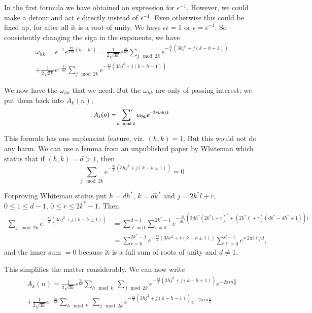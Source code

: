 In the first formula we have obtained an expression for
$\epsilon^{-1}$. However, we could make a detour and act $\epsilon $ directly
instead of $\epsilon^{-1}$. Even otherwise this could be fixed up, for
after all it is a root of unity. We have $\epsilon  \bar{\epsilon} =1$ or $\epsilon  =
\bar{\epsilon}^{-1}$. So consistently changing the sign in the exponents, we
have 
\begin{multline*}
  \omega_{hk}= \bar{\epsilon}^{-1} e^{\frac{\pi i}{12 k} (h- h')} =
  \frac{1}{2\sqrt{3k}} e^{\frac{\pi i}{6k}} \sum_{j \mod 2k}
  e^{-\frac{\pi i}{k}(3 h j^2 + j (k-h+1)) }\\
  + \frac{1}{2\sqrt{3k}} e^{-\frac{\pi i}{6k}} \sum_{j \mod 2k} e^{-
    \frac{\pi i}{k} (3h j^2 + j (k-h-1))}
\end{multline*}

We now have the $\omega_{hk}$ that we need. But the $\omega_{hk}$ are
only of passing interest; we put them back into $A_k (n)$;
$$
A_k(n) = \sideset{}{'}\sum_{h \mod k} \omega_{hk} e^{-2 \pi i n h/k}
$$

This formula has one unpleasant feature, viz. $(h, k)=1$. But this
would not do any harm. We can use a lemma from an unpublished paper by
Whiteman which status that if $(h, k)=d> 1$, then 
$$
\sum_{j \mod 2k} e^{- \frac{\pi i}{k} (3 h j^2 + j (k-h \pm 1))}=0
$$ 

For\pageoriginale proving Whiteman status put $h=dh^*$, $k= dk^*$ and
$j= 2k^* l+r$, $0 \leq 1 \leq d-1$, $0\leq r \leq 2k^* -1$. Then 
\begin{align*}
  \sum_{j \mod 2k} e^{- \frac{\pi i}{k} (3 h j^2 + j (k-h \pm 1))} & =
  \sum_{\ell =0}^{d-1} \sum^{2k^*-1}_{r=0} e^{- \frac{\pi i}{dk^*} (3
    dh^* (2k^*1+ r)^2 + (2k^* \ell + r)(dk^*- dh^* \pm 1) ))}\\
  & = \sum^{2k^*-1}_{r=0} e^{- \frac{\pi i}{k}(3h r^2 + r(k-h \pm 1))}
  \sum^{d-1}_{\ell =0} e^{\mp 2 \pi i \ell/d},
\end{align*}
and the inner sum $=0$ because it is a full sum of roots of unity and
$d \neq 1$.

This simplifies the matter considerably. We can now write
\begin{multline*}
  A_k(n) = \frac{1}{2\sqrt{3k}} e^{\frac{\pi i}{6k}} \sum_{h \mod k}~
  \sum_{j \mod 2k} e^{- \frac{\pi i}{k} (3h j^2 + j (k-h+1))} e^{-2
    \pi i n \frac{h}{k}} \\
  + \frac{1}{2 \sqrt{3k}} e^{- \frac{\pi i}{6k}} \sum_{h \mod k}~
  \sum_{j \mod 2k} e^{- \frac{\pi i}{k} (3 h j^2 + j (k-h-1))} e^{- 2
    \pi i n \frac{h}{k}}
\end{multline*}

